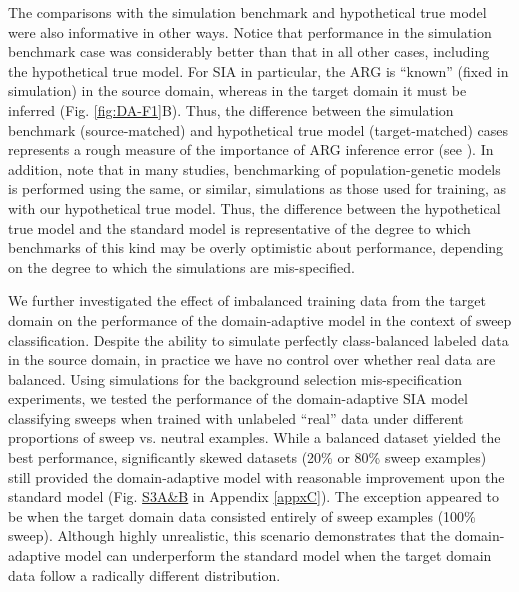 The comparisons with the simulation benchmark and hypothetical true model were also informative in other ways. Notice that performance in the simulation benchmark case was considerably better than that in all other cases, including the hypothetical true model. For \ac{SIA} in particular, the \ac{ARG} is “known” (fixed in simulation) in the source domain, whereas in the target domain it must be inferred (Fig. \ref{fig:DA-F1}B). Thus, the difference between the simulation benchmark (source-matched) and hypothetical true model (target-matched) cases represents a rough measure of the importance of \ac{ARG} inference error (see ). In addition, note that in many studies, benchmarking of population-genetic models is performed using the same, or similar, simulations as those used for training, as with our hypothetical true model. Thus, the difference between the hypothetical true model and the standard model is representative of the degree to which benchmarks of this kind may be overly optimistic about performance, depending on the degree to which the simulations are mis-specified.

We further investigated the effect of imbalanced training data from the target domain on the performance of the domain-adaptive model in the context of sweep classification. Despite the ability to simulate perfectly class-balanced labeled data in the source domain, in practice we have no control over whether real data are balanced. Using simulations for the background selection mis-specification experiments, we tested the performance of the domain-adaptive \ac{SIA} model classifying sweeps when trained with unlabeled “real” data under different proportions of sweep vs. neutral examples. While a balanced dataset yielded the best performance, significantly skewed datasets (20\% or 80\% sweep examples) still provided the domain-adaptive model with reasonable improvement upon the standard model (Fig. \href{https://journals.plos.org/plosgenetics/article?id=10.1371/journal.pgen.1011032\#sec018}{S3A\&B} in Appendix \ref{appxC}). The exception appeared to be when the target domain data consisted entirely of sweep examples (100\% sweep). Although highly unrealistic, this scenario demonstrates that the domain-adaptive model can underperform the standard model when the target domain data follow a radically different distribution.

